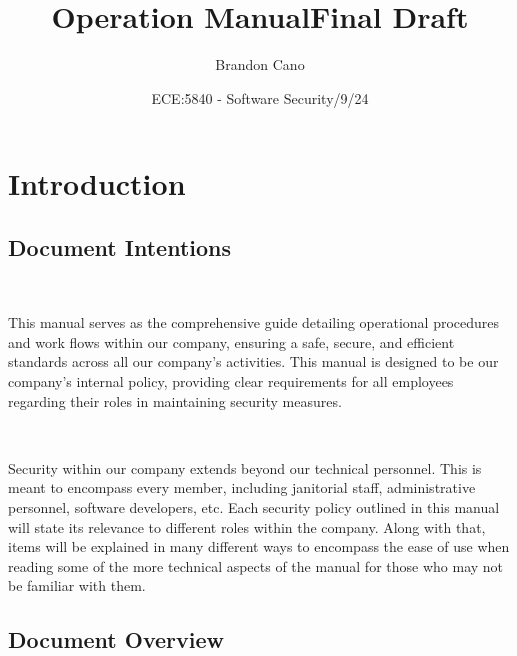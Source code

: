 \documentclass[12pt,a4paper]{report}
\title{\textbf{Operation Manual\linebreak\small Final Draft}}
\author{Brandon Cano}
\date{ECE:5840 - Software Security\linebreak 5/9/24}
\begin{document}
\maketitle
\tableofcontents

\chapter{Introduction}
\section{Document Intentions}
\

This manual serves as the comprehensive guide detailing operational procedures and work flows within our company, ensuring a safe, secure, and efficient standards across all our company's activities.
This manual is designed to be our company's internal policy, providing clear requirements for all employees regarding their roles in maintaining security measures.

\

Security within our company extends beyond our technical personnel. 
This is meant to encompass every member, including janitorial staff, administrative personnel, software developers, etc. 
Each security policy outlined in this manual will state its relevance to different roles within the company.
Along with that, items will be explained in many different ways to encompass the ease of use when reading some of the more technical aspects of the manual for those who may not be familiar with them.

\section{Document Overview}
\
\end{document}

